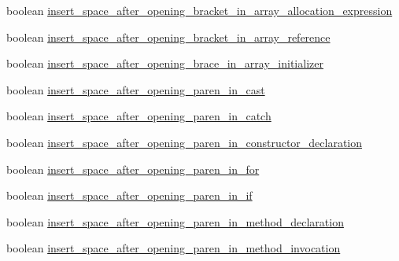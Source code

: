 \begin{DoxyCompactItemize}
\item 
boolean \hyperlink{classorg_1_1eclipse_1_1jdt_1_1ui_1_1tests_1_1refactoring_1_1infra_1_1TestFormatterOptions_a8e07b4a147c2526506d755dbec0c3a43}{insert\_\-space\_\-after\_\-opening\_\-bracket\_\-in\_\-array\_\-allocation\_\-expression}
\item 
boolean \hyperlink{classorg_1_1eclipse_1_1jdt_1_1ui_1_1tests_1_1refactoring_1_1infra_1_1TestFormatterOptions_a778fbfc44a41a9601b39eb2353887758}{insert\_\-space\_\-after\_\-opening\_\-bracket\_\-in\_\-array\_\-reference}
\item 
boolean \hyperlink{classorg_1_1eclipse_1_1jdt_1_1ui_1_1tests_1_1refactoring_1_1infra_1_1TestFormatterOptions_a778f048cf91cc587c589826a158ae409}{insert\_\-space\_\-after\_\-opening\_\-brace\_\-in\_\-array\_\-initializer}
\item 
boolean \hyperlink{classorg_1_1eclipse_1_1jdt_1_1ui_1_1tests_1_1refactoring_1_1infra_1_1TestFormatterOptions_a62a4efa9f4705daa38b792ffec1328ce}{insert\_\-space\_\-after\_\-opening\_\-paren\_\-in\_\-cast}
\item 
boolean \hyperlink{classorg_1_1eclipse_1_1jdt_1_1ui_1_1tests_1_1refactoring_1_1infra_1_1TestFormatterOptions_a3ffec7db5bccea4ba610ea4d1752f34f}{insert\_\-space\_\-after\_\-opening\_\-paren\_\-in\_\-catch}
\item 
boolean \hyperlink{classorg_1_1eclipse_1_1jdt_1_1ui_1_1tests_1_1refactoring_1_1infra_1_1TestFormatterOptions_a8409c7f310612505d5e0540ab57fbd71}{insert\_\-space\_\-after\_\-opening\_\-paren\_\-in\_\-constructor\_\-declaration}
\item 
boolean \hyperlink{classorg_1_1eclipse_1_1jdt_1_1ui_1_1tests_1_1refactoring_1_1infra_1_1TestFormatterOptions_ab4c2262994c49b0fa0662771cd3ba52d}{insert\_\-space\_\-after\_\-opening\_\-paren\_\-in\_\-for}
\item 
boolean \hyperlink{classorg_1_1eclipse_1_1jdt_1_1ui_1_1tests_1_1refactoring_1_1infra_1_1TestFormatterOptions_a0fc6443f28849b0ecef1253d77e97727}{insert\_\-space\_\-after\_\-opening\_\-paren\_\-in\_\-if}
\item 
boolean \hyperlink{classorg_1_1eclipse_1_1jdt_1_1ui_1_1tests_1_1refactoring_1_1infra_1_1TestFormatterOptions_ab4e81e769b91905c3bd824e8eafa6da7}{insert\_\-space\_\-after\_\-opening\_\-paren\_\-in\_\-method\_\-declaration}
\item 
boolean \hyperlink{classorg_1_1eclipse_1_1jdt_1_1ui_1_1tests_1_1refactoring_1_1infra_1_1TestFormatterOptions_aa269668d1ae878a2281816a45bd4b415}{insert\_\-space\_\-after\_\-opening\_\-paren\_\-in\_\-method\_\-invocation}

\end{DoxyCompactItemize}

